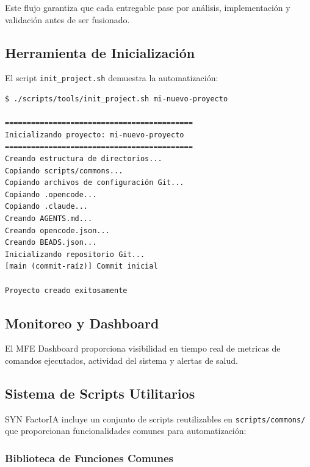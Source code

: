 \documentclass[12pt,a4paper,spanish]{article}
\begin{document}
Este flujo garantiza que cada entregable pase por análisis, implementación y validación antes de ser fusionado.

\subsection{Herramienta de Inicialización}

El script \texttt{init\_project.sh} demuestra la automatización:

\begin{verbatim}
$ ./scripts/tools/init_project.sh mi-nuevo-proyecto

===========================================
Inicializando proyecto: mi-nuevo-proyecto
===========================================
Creando estructura de directorios...
Copiando scripts/commons...
Copiando archivos de configuración Git...
Copiando .opencode...
Copiando .claude...
Creando AGENTS.md...
Creando opencode.json...
Creando BEADS.json...
Inicializando repositorio Git...
[main (commit-raíz)] Commit inicial

Proyecto creado exitosamente
\end{verbatim}

\subsection{Monitoreo y Dashboard}

El MFE Dashboard proporciona visibilidad en tiempo real de metricas de comandos ejecutados, actividad del sistema y alertas de salud.

\subsection{Sistema de Scripts Utilitarios}

SYN FactorIA incluye un conjunto de scripts reutilizables en \texttt{scripts/commons/} que proporcionan funcionalidades comunes para automatización:

\subsubsection{Biblioteca de Funciones Comunes}
\end{document}
